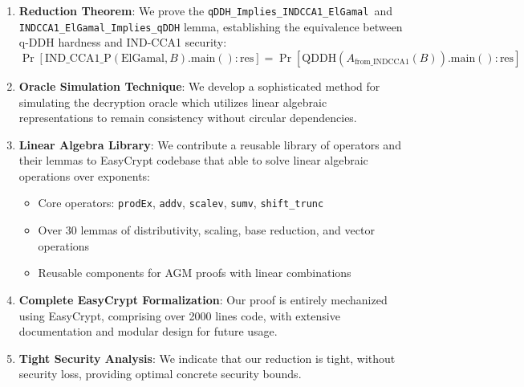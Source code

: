 \begin{enumerate}
\item \textbf{Reduction Theorem}: We prove the \texttt{qDDH\_Implies\_INDCCA1\_ElGamal }and \newline \texttt{INDCCA1\_ElGamal\_Implies\_qDDH} lemma, establishing the equivalence between q-DDH hardness and IND-CCA1 security:
  \[
  \Pr[\text{IND\_CCA1\_P}(\text{ElGamal}, B).\text{main}() : \text{res}] = \Pr[\text{QDDH}(A_{\text{from\_INDCCA1}}(B)).\text{main}() : \text{res}]
  \]

\item \textbf{Oracle Simulation Technique}: We develop a sophisticated method for simulating the decryption oracle which utilizes linear algebraic representations to remain consistency without circular dependencies.

\item \textbf{Linear Algebra Library}: We contribute a reusable library of operators and their lemmas to EasyCrypt codebase that able to solve linear algebraic operations over exponents:
  \begin{itemize}
  \item Core operators: \texttt{prodEx}, \texttt{addv}, \texttt{scalev}, \texttt{sumv}, \texttt{shift\_trunc}
  \item Over 30  lemmas of distributivity, scaling, base reduction, and vector operations
  \item Reusable components for AGM proofs with linear combinations
  \end{itemize}

\item \textbf{Complete EasyCrypt Formalization}: Our proof is entirely mechanized using EasyCrypt, comprising over 2000 lines code, with extensive documentation and modular design for future usage.

\item \textbf{Tight Security Analysis}: We indicate that our reduction is tight, without security loss, providing optimal concrete security bounds.
\end{enumerate}







\newpage


